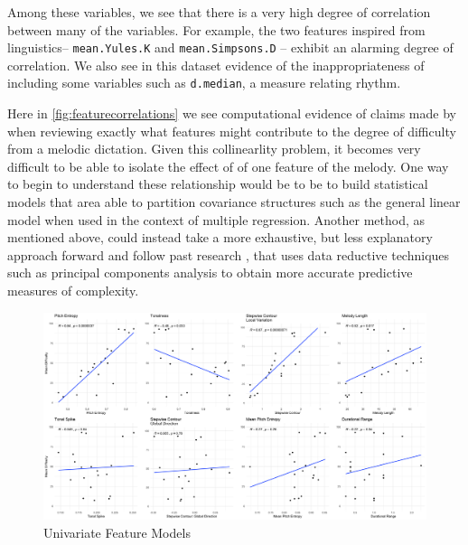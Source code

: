 \documentclass[]{book}
\begin{document}
Among these variables, we see that there is a very high degree of correlation between many of the variables.
For example, the two features inspired from linguistics-- \texttt{mean.Yules.K} and \texttt{mean.Simpsons.D} -- exhibit an alarming degree of correlation.
We also see in this dataset evidence of the inappropriateness of including some variables such as \texttt{d.median}, a measure relating rhythm.

Here in \ref{fig:featurecorrelations} we see computational evidence of claims made by \citet{taylorStrategiesMemoryShort1983} when reviewing exactly what features might contribute to the degree of difficulty from a melodic dictation.
Given this collinearlity problem, it becomes very difficult to be able to isolate the effect of of one feature of the melody.
One way to begin to understand these relationship would be to be to build statistical models that area able to partition covariance structures such as the general linear model when used in the context of multiple regression.
Another method, as mentioned above, could instead take a more exhaustive, but less explanatory approach forward and follow past research \citep{bakerPerceptionLeitmotivesRichard2017, harrisonModellingMelodicDiscrimination2016}, that uses data reductive techniques such as principal components analysis to obtain more accurate predictive measures of complexity.

\begin{figure}

{\centering \includegraphics[width=1\linewidth]{img/univariate_cow} 

}

\caption{Univariate Feature Models}\label{fig:univariatecow}
\end{figure}
\end{document}
